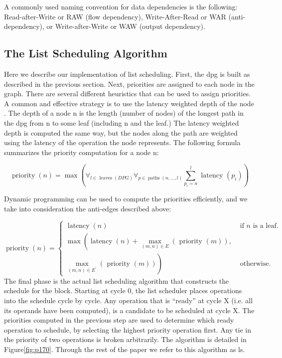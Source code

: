 A commonly used naming convention for data dependencies is the following: Read-after-Write or RAW (flow dependency), Write-After-Read or WAR (anti-dependency), or Write-after-Write or WAW (output dependency).

\subsection{The List Scheduling Algorithm}

Here we describe our implementation of list scheduling. First, the dpg is built as described in the previous
section. Next, priorities are assigned to each node in the graph. There are several different heuristics that
can be used to assign priorities. A common and effective strategy is to use the latency weighted depth of the
node \cite{gibbons1986efficient,landskov1980local}. The depth of a node n is the length (number of nodes) of the longest path in the dpg from n to
some leaf (including n and the leaf.) The latency weighted depth is computed the same way, but the nodes
along the path are weighted using the latency of the operation the node represents. The following formula
summarizes the priority computation for a node n:

$$
\operatorname{priority}(n)=\max \left(\forall_{l \in \text { leaves }(D P G)} \forall_{p \in \operatorname{paths}(n, \ldots, l)} \sum_{p_i=n}^l \text { latency }\left(p_i\right)\right)
$$

Dynamic programming can be used to compute the priorities efficiently, and we take into consideration
the anti-edges described above:

$$
\operatorname{priority}(n)=\left\{\begin{array}{cc}
\operatorname{latency}(n) & \text { if } n \text { is a leaf. } \\
\max \left(\operatorname{latency}(n)+\max _{(m, n) \in E}(\text { priority }(m)),\right. & \\
\left.\max _{(m, n) \in E^{\prime}}(\text { priority }(m))\right) & \text { otherwise. }
\end{array}\right.
$$
The final phase is the actual list scheduling algorithm that constructs the schedule for the block. Starting
at cycle 0, the list scheduler places operations into the schedule cycle by cycle. Any operation that is “ready”
at cycle X (i.e. all its operands have been computed), is a candidate to be scheduled at cycle X. The priorities
computed in the previous step are used to determine which ready operation to schedule, by selecting the
highest priority operation first. Any tie in the priority of two operations is broken arbitrarily. The algorithm
is detailed in Figure\ref{fig:p170}. Through the rest of the paper we refer to this algorithm as ls.


